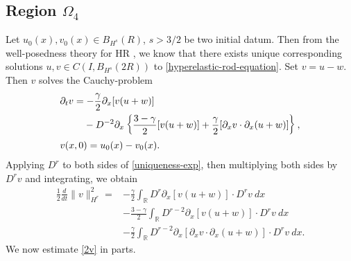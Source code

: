 \documentclass[12pt,reqno]{amsart}
\numberwithin{equation}{section}  %
\numberwithin{figure}{section}
\newcommand{\rr}{\mathbb{R}}
\newcommand{\p}{\partial}
\begin{document}
\subsection{Region $\Omega_{4}$} 
\label{ssec:reg-m-imp}
%
%
Let $u_{0}(x), v_{0}(x)
\in B_{H^{s}}(R)$, $s > 3/2$ be two initial datum. Then from
the well-posedness theory for HR \cite{Karapetyan:2010fk}, we
know that there exists unique corresponding solutions $u, v \in C(I,
B_{H^{s}}(2R))$ to \eqref{hyperelastic-rod-equation}.
Set $v=u-w$. Then $v$ solves the Cauchy-problem
%
%
\begin{align}
	\label{uniqueness-exp}
& \p_t v
=  -\frac{\gamma}{2} \p_x [v(u + w)] 
\\
\notag
& \phantom{\p_t v = }- D^{-2} \p_x \left\{
\frac{3-\gamma}{2}[v(u+w)] + \frac{\gamma}{2}[\p_x v \cdot \p_x (u+w)]
\right\},
\\
& v(x,0) = u_{0}(x) - v_{0}(x).
\label{uniqueness-init-data}
\end{align}
%
%
%
%
Applying $D^r$ to both sides of \eqref{uniqueness-exp}, then 
multiplying both sides by $D^r v$ and integrating, we obtain
%
%
\begin{equation}
\begin{split}
 \frac{1}{2} \frac{d}{dt} \|v\|_{H^r}^2
 = & -\frac{\gamma}{2} \int_{\rr} D^r \p_x [v(u+w)] \cdot
D^r v \ dx
\\
& - \frac{3-\gamma}{2} \int_{\rr}  D^{r -2}
\p_x[v(u+w)] \cdot
D^r v \ dx  
\\
& - \frac{\gamma}{2} \int_{\rr} D^{r 
-2} \p_x [ \p_x v
\cdot \p_x (u+w)]\cdot D^r v \ dx.
\label{2v}
\end{split}
\end{equation}
%
%
We now estimate \eqref{2v} in parts.
\end{document}
